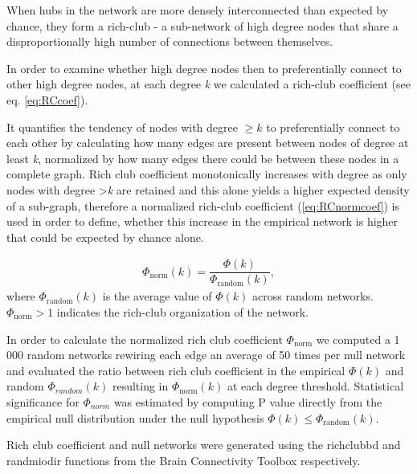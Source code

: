 \documentclass[10pt,letterpaper]{article}
\begin{document}
When hubs in the network are more densely interconnected than expected by chance, they form a rich-club - a sub-network of high degree nodes that share a disproportionally high number of connections between themselves.

In order to examine whether high degree nodes then to preferentially connect to other high degree nodes, at each degree \textit{k} we calculated a rich-club coefficient (see eq. \ref{eq:RCcoef}).

It quantifies the tendency of nodes with degree $\geq k$ to preferentially connect to each other by calculating how many edges are present between nodes of degree at least \textit{k}, normalized by how many edges there could be between these nodes in a complete graph.
Rich club coefficient monotonically increases with degree as only nodes with degree >\textit{k} are retained and this alone yields a higher expected density of a sub-graph, therefore a normalized rich-club coefficient (\ref{eq:RCnormcoef}) is used in order to define, whether this increase in the empirical network is higher that could be expected by chance alone.

\begin{eqnarray}
	\label{eq:RCnormcoef}
     \Phi_\mathrm{norm}(k) = \dfrac{\Phi(k)}{\Phi_\mathrm{random}(k)},
	 \end{eqnarray}
where $\Phi_\mathrm{random}(k)$ is the average value of $\Phi(k)$ across random networks.
$\Phi_\mathrm{norm}>1$ indicates the rich-club organization of the network.

In order to calculate the normalized rich club coefficient $\Phi_\mathrm{norm}$ we computed a 1\,000 random networks rewiring each edge an average of 50 times per null network and evaluated the ratio between rich club coefficient in the empirical $\Phi(k)$ and random $\Phi_{random}(k)$ resulting in $\Phi_\mathrm{norm}(k)$ at each degree threshold.
Statistical significance for $\Phi_{norm}$ was estimated by computing P value directly from the empirical null distribution under the null hypothesis $\Phi(k) \leq \Phi_\mathrm{random}(k)$.

Rich club coefficient and null networks were generated using the rich\textunderscore club\textunderscore bd and randmio\textunderscore dir functions from the Brain Connectivity Toolbox \cite{Rubinov2010} respectively.

\end{document}
